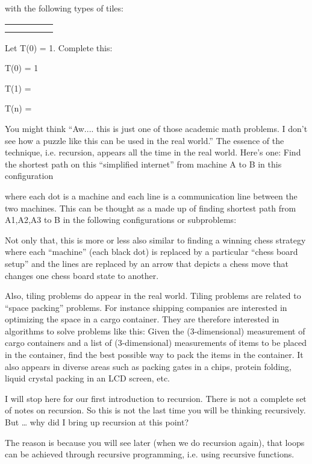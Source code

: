 \documentclass[
]{article}
\begin{document}
with the following types of tiles:

\begin{longtable}[]{@{}lllll@{}}
\toprule
\endhead
& & & &\tabularnewline
& & & &\tabularnewline
\bottomrule
\end{longtable}

Let T(0) = 1. Complete this:

T(0) = 1

T(1) =

T(n) =

You might think ``Aw.... this is just one of those academic math
problems. I don't see how a puzzle like this can be used in the real
world.'' The essence of the technique, i.e. recursion, appears all the
time in the real world. Here's one: Find the shortest path on this
``simplified internet'' from machine A to B in this configuration

where each dot is a machine and each line is a communication line
between the two machines. This can be thought as a made up of finding
shortest path from A1,A2,A3 to B in the following configurations or
subproblems:

Not only that, this is more or less also similar to finding a winning
chess strategy where each ``machine'' (each black dot) is replaced by a
particular ``chess board setup'' and the lines are replaced by an arrow
that depicts a chess move that changes one chess board state to another.

Also, tiling problems do appear in the real world. Tiling problems are
related to ``space packing'' problems. For instance shipping companies
are interested in optimizing the space in a cargo container. They are
therefore interested in algorithms to solve problems like this: Given
the (3-dimensional) measurement of cargo containers and a list of
(3-dimensional) measurements of items to be placed in the container,
find the best possible way to pack the items in the container. It also
appears in diverse areas such as packing gates in a chips, protein
folding, liquid crystal packing in an LCD screen, etc.

I will stop here for our first introduction to recursion. There is not a
complete set of notes on recursion. So this is not the last time you
will be thinking recursively. But \ldots{} why did I bring up recursion
at this point?

The reason is because you will see later (when we do recursion again),
that loops can be achieved through recursive programming, i.e. using
recursive functions.
\end{document}
